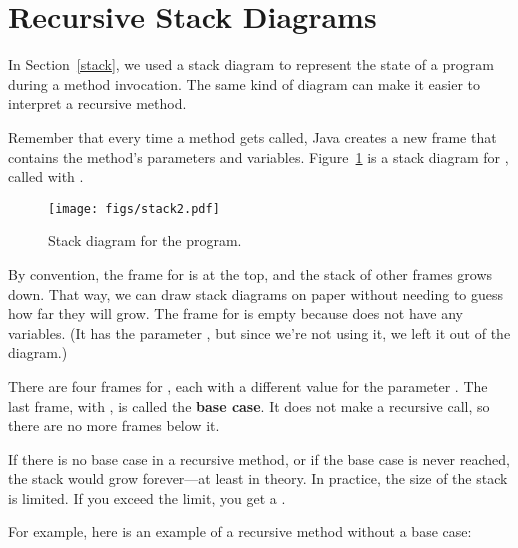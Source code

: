 
\section{Recursive Stack Diagrams}


In Section~\ref{stack}, we used a stack diagram to represent the state of a program during a method invocation.
The same kind of diagram can make it easier to interpret a recursive method.

Remember that every time a method gets called, Java creates a new frame that contains the method's parameters and variables.
Figure~\ref{fig.stack2} is a stack diagram for , called with .

\begin{figure}[!ht]
\begin{center}
\texttt{[image: figs/stack2.pdf]}
\caption{Stack diagram for the  program.}
\label{fig.stack2}
\end{center}
\end{figure}

By convention, the frame for  is at the top, and the stack of other frames grows down.
That way, we can draw stack diagrams on paper without needing to guess how far they will grow.
The frame for  is empty because  does not have any variables.
(It has the parameter , but since we're not using it, we left it out of the diagram.)


There are four frames for , each with a different value for the parameter .
The last frame, with , is called the {\bf base case}.
It does not make a recursive call, so there are no more frames below it.


If there is no base case in a recursive method, or if the base case is never reached, the stack would grow forever---at least in theory.
In practice, the size of the stack is limited.
If you exceed the limit, you get a .

For example, here is an example of a recursive method without a base case:

